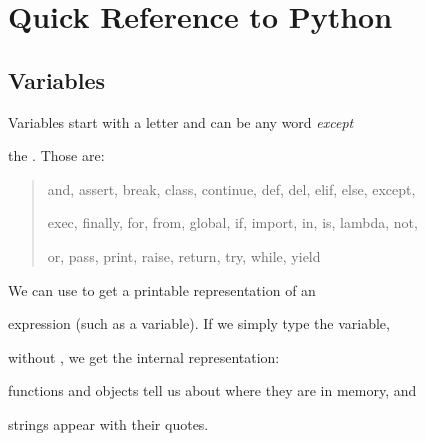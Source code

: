 

\chapter{Quick Reference to Python}






    \graphicspath{{figs/}{figs/cs/}}



\section{Variables}



Variables start with a letter and can be any word \emph{except}

the .  Those are:



\begin{quote}

and, assert, break, class, continue, def, del, elif, else, except,

exec, finally, for, from, global, if, import, in, is, lambda, not,

or, pass, print, raise, return, try, while, yield

\end{quote}



We can use  to get a printable representation of an

expression (such as a variable).  If we simply type the variable,

without , we get the internal representation:

functions and objects tell us about where they are in memory, and

strings appear with their quotes.



